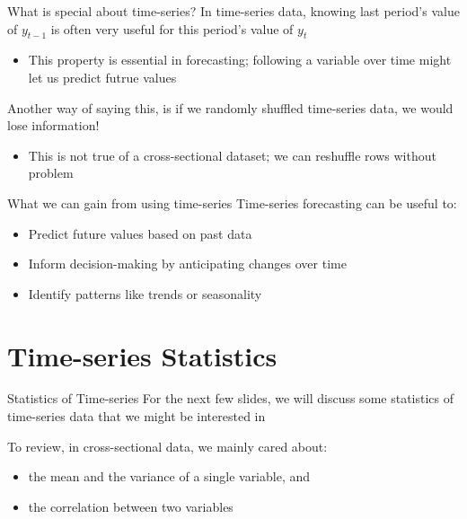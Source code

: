 \documentclass[aspectratio=169,t,11pt,table]{beamer}
\begin{document}
\begin{frame}{What is special about time-series?}
  In time-series data, knowing last period's value of $y_{t-1}$ is often very useful for this period's value of $y_{t}$
  \begin{itemize}
    \item This property is essential in forecasting; following a variable over time might let us predict futrue values
  \end{itemize}

  \pause
  \bigskip
  Another way of saying this, is if we randomly shuffled time-series data, we would lose information!
  \begin{itemize}
    \item This is not true of a cross-sectional dataset; we can reshuffle rows without problem
  \end{itemize}
\end{frame}


\begin{frame}{What we can gain from using time-series}
  Time-series forecasting can be useful to:
  \begin{itemize}
    \item Predict future values based on past data

    \item Inform decision-making by anticipating changes over time

    \item Identify patterns like trends or seasonality
  \end{itemize}
\end{frame}


\section{Time-series Statistics}

\begin{frame}{Statistics of Time-series}
  For the next few slides, we will discuss some \alert{statistics} of time-series data that we might be interested in

  \bigskip
  To review, in cross-sectional data, we mainly cared about:
  \begin{itemize}
    \item the \alert{mean} and the \alert{variance} of a single variable, and
    \item the \alert{correlation} between two variables
  \end{itemize}
\end{frame}
\end{document}
